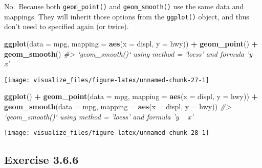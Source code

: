 \documentclass[]{book}
\newenvironment{Shaded}{\begin{snugshade}}{\end{snugshade}}
\newcommand{\CommentTok}[1]{\textcolor[rgb]{0.56,0.35,0.01}{\textit{#1}}}
\newcommand{\DataTypeTok}[1]{\textcolor[rgb]{0.13,0.29,0.53}{#1}}
\newcommand{\KeywordTok}[1]{\textcolor[rgb]{0.13,0.29,0.53}{\textbf{#1}}}
\newcommand{\NormalTok}[1]{#1}
\newcommand{\OperatorTok}[1]{\textcolor[rgb]{0.81,0.36,0.00}{\textbf{#1}}}
\newcommand{\StringTok}[1]{\textcolor[rgb]{0.31,0.60,0.02}{#1}}
\theoremstyle{plain}
\theoremstyle{remark}
\theoremstyle{definition}
\theoremstyle{definition}
\theoremstyle{definition}
\theoremstyle{remark}
\begin{document}
No.~Because both \texttt{geom\_point()} and \texttt{geom\_smooth()} use
the same data and mappings. They will inherit those options from the
\texttt{ggplot()} object, and thus don't need to specified again (or
twice).

\begin{Shaded}
\begin{Highlighting}[]
\KeywordTok{ggplot}\NormalTok{(}\DataTypeTok{data =}\NormalTok{ mpg, }\DataTypeTok{mapping =} \KeywordTok{aes}\NormalTok{(}\DataTypeTok{x =}\NormalTok{ displ, }\DataTypeTok{y =}\NormalTok{ hwy)) }\OperatorTok{+}
\StringTok{  }\KeywordTok{geom_point}\NormalTok{() }\OperatorTok{+}
\StringTok{  }\KeywordTok{geom_smooth}\NormalTok{()}
\CommentTok{#> `geom_smooth()` using method = 'loess' and formula 'y ~ x'}
\end{Highlighting}
\end{Shaded}

\begin{center}\texttt{[image: visualize\_files/figure-latex/unnamed-chunk-27-1]} \end{center}

\begin{Shaded}
\begin{Highlighting}[]
\KeywordTok{ggplot}\NormalTok{() }\OperatorTok{+}
\StringTok{  }\KeywordTok{geom_point}\NormalTok{(}\DataTypeTok{data =}\NormalTok{ mpg, }\DataTypeTok{mapping =} \KeywordTok{aes}\NormalTok{(}\DataTypeTok{x =}\NormalTok{ displ, }\DataTypeTok{y =}\NormalTok{ hwy)) }\OperatorTok{+}
\StringTok{  }\KeywordTok{geom_smooth}\NormalTok{(}\DataTypeTok{data =}\NormalTok{ mpg, }\DataTypeTok{mapping =} \KeywordTok{aes}\NormalTok{(}\DataTypeTok{x =}\NormalTok{ displ, }\DataTypeTok{y =}\NormalTok{ hwy))}
\CommentTok{#> `geom_smooth()` using method = 'loess' and formula 'y ~ x'}
\end{Highlighting}
\end{Shaded}

\begin{center}\texttt{[image: visualize\_files/figure-latex/unnamed-chunk-28-1]} \end{center}

\hypertarget{exercise-3.6.6}{%
\subsection*{\texorpdfstring{Exercise
{3.6.6}}{Exercise 3.6.6}}\label{exercise-3.6.6}}
\end{document}
